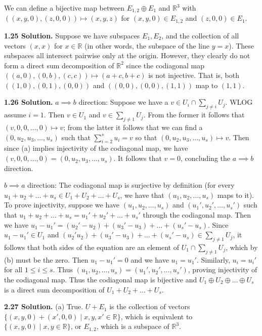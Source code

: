 We can define a bijective map between $E_{1,2} \oplus E_1$ and $\mathbb{R}^3$ with $((x,y,0),(z,0,0)) \mapsto (x,y,z)$ for $(x,y,0) \in E_{1,2}$ and $(z,0,0) \in E_1$.

\textbf{1.25 Solution.} Suppose we have subspaces $E_1, E_2$, and the collection of all vectors $(x,x)$ for $x \in \mathbb{R}$ (in other words, the subspace of the line $y=x$). These subspaces all intersect pairwise only at the origin. However, they clearly do not form a direct sum decomposition of $\mathbb{R}^2$ since the codiagonal map $((a,0),(0,b),(c,c)) \mapsto (a+c,b+c)$ is not injective. That is, both $((1,0),(0,1),(0,0))$ and $((0,0),(0,0),(1,1))$ map to $(1,1)$.

\textbf{1.26 Solution.} $a \implies b$ direction: Suppose we have a $v \in U_i \cap \sum\limits_{j\neq i}U_j$. WLOG assume $i=1$. Then $v \in U_1$ and $v \in \sum\limits_{j\neq 1}U_j$. From the former it follows that $(v,0,0,\ldots,0) \mapsto v$; from the latter it follows that we can find a $(0,u_2,u_3,\ldots,u_s)$ such that $\sum\limits_{i=2}^s u_i = v$ so that $(0,u_2,u_3,\ldots,u_s) \mapsto v$. Then since (a) implies injectivity of the codiagonal map, we have $(v,0,0,\ldots,0) = (0,u_2,u_3,\ldots,u_s)$. It follows that $v = 0$, concluding the $a \implies b$ direction.

$b \implies a$ direction: The codiagonal map is surjective by definition (for every $u_1+u_2+\ldots+u_s \in U_1+U_2+\ldots+U_s$, we have that $(u_1,u_2,\ldots,u_s)$ maps to it). To prove injectivity, suppose we have $(u_1,u_2,\ldots,u_s)$ and $(u_1',u_2',\ldots,u_s')$ such that $u_1+u_2+\ldots+u_s = u_1'+u_2'+\ldots+u_s'$ through the codiagonal map. Then we have $u_1-u_1' = (u_2'-u_2)+(u_3'-u_3)+\ldots+(u_s'-u_s)$. Since $u_1-u_1' \in U_1$ and $(u_2'u_2)+(u_3'-u_3)+\ldots+(u_s'-u_s) \in \sum\limits_{j\neq 1}U_j$, it follows that both sides of the equation are an element of $U_1 \cap \sum\limits_{j\neq 1}U_j$, which by (b) must be the zero. Then $u_1-u_1' = 0$ and we have $u_1 = u_1'$. Similarly, $u_i = u_i'$ for all $1 \leq i \leq s$. Thus $(u_1,u_2,\ldots,u_s) = (u_1',u_2',\ldots,u_s')$, proving injectivity of the codiagonal map. Thus the codiagonal map is bijective and $U_1 \oplus U_2 \oplus \ldots \oplus U_s$ is a direct sum decomposition of $U_1 + U_2 + \ldots + U_s$.

\textbf{2.27 Solution.} (a) True. $U + E_1$ is the collection of vectors $\{(x,y,0) + (x',0,0) \mid x,y,x' \in \mathbb{R}\}$, which is equivalent to $\{(x,y,0) \mid x,y \in \mathbb{R}\}$, or $E_{1,2}$, which is a subspace of $\mathbb{R}^3$.


